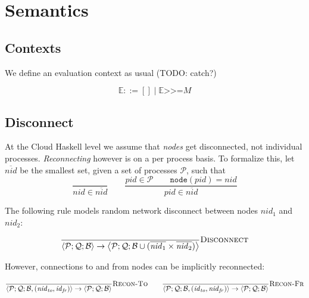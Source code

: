 \documentclass{article}
\newcommand{\sBind}[2]{{#1} \mathrel{\texttt{>}\!\!\texttt{>}\!\texttt{=}} {#2}}
\newcommand{\sPid}{\ensuremath{\mathit{pid}}}
\newcommand{\sNid}{\ensuremath{\mathit{nid}}}
\newcommand{\sId}{\ensuremath{\mathit{id}}}
\newcommand{\sSystem}[3]{\left\langle #1 ; #2 ; #3 \right\rangle}
\newcommand{\sQueue}{\mathcal{Q}}
\newcommand{\sProcesses}{\mathcal{P}}
\newcommand{\sBlacklist}{\mathcal{B}}
\newcommand{\sCtxt}[1]{\mathbb{#1}}
\newcommand{\OR}{\mathrel{|}}
\begin{document}
\section{Semantics}

\subsection{Contexts}

We define an evaluation context as usual (TODO: catch?)

\begin{equation*}
\sCtxt{E} ::= [] \OR \sBind{\sCtxt{E}}{M}
\end{equation*}

\subsection{Disconnect}

At the Cloud Haskell level we assume that \emph{nodes} get disconnected, not
individual processes. \emph{Reconnecting} however is on a per process basis. To
formalize this, let $\overline{\sNid}$ be the smallest set, given a set of
processes $\sProcesses$, such that
%
\begin{equation*}
\frac{
}{
\sNid \in \overline{\sNid}
} 
%
\qquad
%
\frac{
\sPid \in \sProcesses \qquad
\mathtt{node}(\sPid) = \sNid
}{
\sPid \in \overline{\sNid}
}
\end{equation*}

The following rule models random network disconnect between nodes $\sNid_1$ and
$\sNid_2$:

\begin{equation*}
\frac{
}{
  \sSystem{\sProcesses}{\sQueue}{\sBlacklist}
\rightarrow
  \sSystem{\sProcesses}{\sQueue}{\sBlacklist \cup (\overline{\sNid_1} \times \overline{\sNid_2})}
} \textsc{Disconnect}
\end{equation*}

However, connections to and from nodes can be implicitly reconnected:

\begin{equation*}
\frac{
}{
  \sSystem{\sProcesses}{\sQueue}{\sBlacklist, (\sNid_\mathit{to}, \sId_\mathit{fr})}
\rightarrow
  \sSystem{\sProcesses}{\sQueue}{\sBlacklist}
} \textsc{Recon-To}
\qquad
\frac{
}{
  \sSystem{\sProcesses}{\sQueue}{\sBlacklist, (\sId_\mathit{to}, \sNid_\mathit{fr})}
\rightarrow
  \sSystem{\sProcesses}{\sQueue}{\sBlacklist}
} \textsc{Recon-Fr}
\end{equation*}
\end{document}
